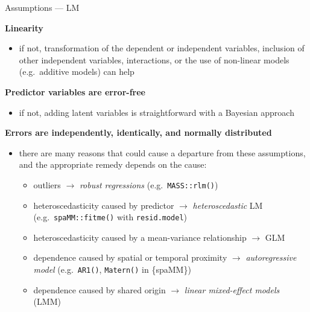 \documentclass[
  10pt,
  ignorenonframetext,
  aspectratio=169,
  t]{beamer}
\providecommand{\tightlist}{%
  \setlength{\itemsep}{0pt}\setlength{\parskip}{0pt}}
\newcommand{\blueit}[1]{\textcolor{bluebeamer}{\emph{#1}}}
\newcommand{\bluebold}[1]{\textcolor{bluebeamer}{\textbf{#1}}}
\let\oldtexttt\texttt
\renewcommand{\texttt}[1]{\colorbox{gray!20}{\oldtexttt{#1}}}
\begin{document}
\begin{frame}[fragile]{Assumptions --- LM}
\protect{}\label{assumptions-lm}
\small

\bluebold{Linearity}

\begin{itemize}
\tightlist
\item
  if not, transformation of the dependent or independent variables,
  inclusion of other independent variables, interactions, or the use of
  non-linear models (e.g.~additive models) can help
\end{itemize}

\pause

\bluebold{Predictor variables are error-free}

\begin{itemize}
\tightlist
\item
  if not, adding latent variables is straightforward with a Bayesian
  approach
\end{itemize}

\pause

\bluebold{Errors are independently, identically, and normally distributed}

\begin{itemize}
\item
  there are many reasons that could cause a departure from these
  assumptions, and the appropriate remedy depends on the cause:

  \begin{itemize}
  \tightlist
  \item
    outliers \(\rightarrow\) \blueit{robust regressions}
    (e.g.~\texttt{MASS::rlm()})
  \item
    heteroscedasticity caused by predictor \(\rightarrow\)
    \blueit{heteroscedastic} LM (e.g.~\texttt{spaMM::fitme()} with
    \texttt{resid.model})
  \item
    heteroscedasticity caused by a mean-variance relationship
    \(\rightarrow\) GLM
  \item
    dependence caused by spatial or temporal proximity \(\rightarrow\)
    \blueit{autoregressive model} (e.g.~\texttt{AR1()},
    \texttt{Matern()} in \{spaMM\})
  \item
    dependence caused by shared origin \(\rightarrow\)
    \blueit{linear mixed-effect models} (LMM)
  \end{itemize}
\end{itemize}
\end{frame}
\end{document}
